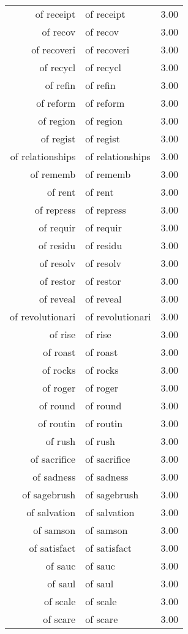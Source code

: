 \begin{table}[ht]
\begin{tabular}{rlr}
  of receipt & of receipt & 3.00 \\ 
  of recov & of recov & 3.00 \\ 
  of recoveri & of recoveri & 3.00 \\ 
  of recycl & of recycl & 3.00 \\ 
  of refin & of refin & 3.00 \\ 
  of reform & of reform & 3.00 \\ 
  of region & of region & 3.00 \\ 
  of regist & of regist & 3.00 \\ 
  of relationships & of relationships & 3.00 \\ 
  of rememb & of rememb & 3.00 \\ 
  of rent & of rent & 3.00 \\ 
  of repress & of repress & 3.00 \\ 
  of requir & of requir & 3.00 \\ 
  of residu & of residu & 3.00 \\ 
  of resolv & of resolv & 3.00 \\ 
  of restor & of restor & 3.00 \\ 
  of reveal & of reveal & 3.00 \\ 
  of revolutionari & of revolutionari & 3.00 \\ 
  of rise & of rise & 3.00 \\ 
  of roast & of roast & 3.00 \\ 
  of rocks & of rocks & 3.00 \\ 
  of roger & of roger & 3.00 \\ 
  of round & of round & 3.00 \\ 
  of routin & of routin & 3.00 \\ 
  of rush & of rush & 3.00 \\ 
  of sacrifice & of sacrifice & 3.00 \\ 
  of sadness & of sadness & 3.00 \\ 
  of sagebrush & of sagebrush & 3.00 \\ 
  of salvation & of salvation & 3.00 \\ 
  of samson & of samson & 3.00 \\ 
  of satisfact & of satisfact & 3.00 \\ 
  of sauc & of sauc & 3.00 \\ 
  of saul & of saul & 3.00 \\ 
  of scale & of scale & 3.00 \\ 
  of scare & of scare & 3.00 \\ 

\end{tabular}
\end{table}
